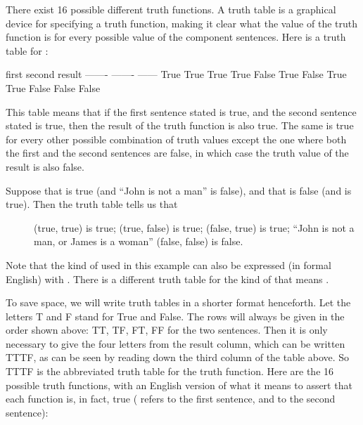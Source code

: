 There exist 16 possible different truth functions. A truth
    table is a graphical device for specifying a truth function,
    making it clear what the value of the truth function is for
    every possible value of the component sentences. Here is a
    truth table for :

   first       second      result
    -------     -------     ------
    True        True        True
    True        False       True
    False       True        True
    False       False       False

This table means that if the first sentence stated is true,
    and the second sentence stated is true, then the result of the
    truth function is also true. The same is true for every other
    possible combination of truth values except the one where both
    the first and the second sentences are false, in which case the
    truth value of the result is also false.

Suppose that  is true (and ``John is not a
    man'' is false), and that  is false (and
     is true). Then the truth table tells
    us that
\begin{description}
\item[]  (true, true) is true;  (true, false) is true;  (false, true) is true; ``John is not a man, or James is a woman'' (false, false) is false.

\end{description}

Note that the kind of  used
    in this example can also be expressed (in formal English) with
    . There is a different truth table for the kind of
     that means . 

To save space, we will write truth tables in a shorter
    format henceforth. Let the letters T and F stand for True and
    False. The rows will always be given in the order shown above:
    TT, TF, FT, FF for the two sentences. Then it is only necessary
    to give the four letters from the result column, which can be
    written TTTF, as can be seen by reading down the third column
    of the table above. So TTTF is the abbreviated truth table for
    the  truth function. Here are the 16 possible truth
    functions, with an English version of what it means to assert
    that each function is, in fact, true ( refers to the
    first sentence, and  to the second sentence):

